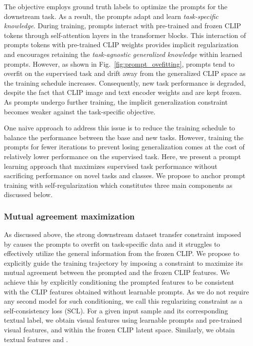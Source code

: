 \documentclass[10pt,twocolumn,letterpaper]{article}
\begin{document}
The  objective employs ground truth labels to optimize the prompts for the downstream task.
As a result, the prompts adapt and learn \emph{task-specific knowledge}. During training, prompts interact with pre-trained and frozen CLIP tokens through self-attention layers in the transformer blocks. This interaction of prompts tokens with pre-trained CLIP weights  provides implicit regularization and encourages retaining the \emph{task-agnostic generalized knowledge} within learned prompts.
However, as shown in Fig.~\ref{fig:prompt_ovefitting}, prompts tend to overfit on the supervised task and drift away from the generalized CLIP space as the training schedule increases. Consequently, new task performance is degraded, despite the fact that CLIP image and text encoder weights  and  are kept frozen. 
As prompts undergo further training, the implicit generalization constraint becomes weaker against the task-specific  objective.

One naive approach to address this issue is to reduce the training schedule to balance the performance between the base and new tasks. However, training the prompts for fewer iterations to prevent losing generalization comes at the cost of relatively lower performance on the supervised task. Here, we present a prompt learning approach that maximizes supervised task performance without sacrificing performance on novel tasks and classes. We propose to anchor prompt training with self-regularization which constitutes three main components as discussed below.

\subsubsection{Mutual agreement maximization}
\label{mutual_agreement_para}
As discussed above, the strong downstream dataset transfer constraint imposed by  causes the prompts to overfit on task-specific data and it struggles to effectively utilize the general information from the frozen CLIP. We propose to explicitly guide the training trajectory by imposing a constraint to maximize its mutual agreement between the prompted and the frozen CLIP features. We achieve this by explicitly conditioning the prompted features to be consistent with the CLIP features obtained without learnable prompts. As we do not require any second model for such conditioning, we call this regularizing constraint as a self-consistency loss (SCL).
For a given input sample and its corresponding textual label, we obtain visual features using learnable prompts and pre-trained visual features,  and  within the frozen CLIP latent space. Similarly, we obtain textual features  and .
\end{document}
